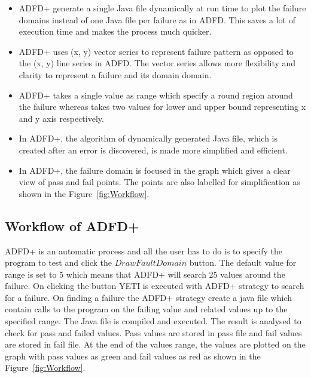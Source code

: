 \begin{itemize}
\item ADFD+ generate a single Java file dynamically at run time to plot the failure domains instead of one Java file per failure as in ADFD. This saves a lot of execution time and makes the process much quicker.

\item ADFD+ uses (x, y) vector series to represent failure pattern as opposed to the (x, y) line series in ADFD. The vector series allows more flexibility and clarity to represent a failure and its domain domain.   

\item ADFD+ takes a single value as range which specify a round region around the failure whereas takes two values for lower and upper bound representing x and y axis respectively.

\item In ADFD+, the algorithm of dynamically generated Java file, which is created after an error is discovered, is made more simplified and efficient.

\item In ADFD+, the failure domain is focused in the graph which gives a clear view of pass and fail points. The points are also labelled for simplification as shown in the Figure~\ref{fig:Workflow}. 

\end{itemize}



\subsection{Workflow of ADFD+}
ADFD+ is an automatic process and all the user has to do is to specify the program to test and click the $Draw Fault Domain$ button. The default value for range is set to 5 which means that ADFD+ will search 25 values around the failure. On clicking the button YETI is executed with ADFD+ strategy to search for a failure. On finding a failure the ADFD+ strategy create a java file which contain calls to the program on the failing value and related values up to the specified range. The Java file is compiled and executed. The result is analysed to check for pass and failed values. Pass values are stored in pass file and fail values are stored in fail file. At the end of the values range, the values are plotted on the graph with pass values as green and fail values as red as shown in the Figure~\ref{fig:Workflow}.


